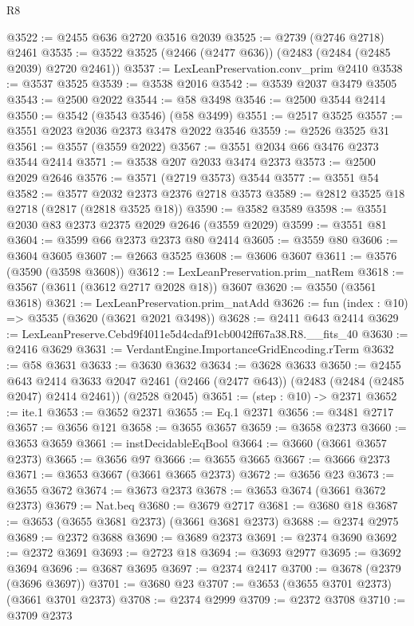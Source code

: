 \begin{lexlean}{R8}
\begin{coremodule}
@3522 := @2455 @636 @2720 @3516 @2039
@3525 := @2739 (@2746 @2718) @2461
@3535 := @3522 @3525 (@2466 (@2477 @636)) (@2483 (@2484 (@2485 @2039) @2720 @2461))
@3537 := LexLeanPreservation.conv_prim @2410
@3538 := @3537 @3525
@3539 := @3538 @2016
@3542 := @3539 @2037 @3479 @3505
@3543 := @2500 @2022
@3544 := @58 @3498
@3546 := @2500 @3544 @2414
@3550 := @3542 (@3543 @3546) (@58 @3499)
@3551 := @2517 @3525
@3557 := @3551 @2023 @2036 @2373 @3478 @2022 @3546
@3559 := @2526 @3525 @31
@3561 := @3557 (@3559 @2022)
@3567 := @3551 @2034 @66 @3476 @2373 @3544 @2414
@3571 := @3538 @207 @2033 @3474 @2373
@3573 := @2500 @2029 @2646
@3576 := @3571 (@2719 @3573) @3544
@3577 := @3551 @54
@3582 := @3577 @2032 @2373 @2376 @2718 @3573
@3589 := @2812 @3525 @18 @2718 (@2817 (@2818 @3525 @18))
@3590 := @3582 @3589
@3598 := @3551 @2030 @83 @2373 @2375 @2029 @2646 (@3559 @2029)
@3599 := @3551 @81
@3604 := @3599 @66 @2373 @2373 @80 @2414
@3605 := @3559 @80
@3606 := @3604 @3605
@3607 := @2663 @3525
@3608 := @3606 @3607
@3611 := @3576 (@3590 (@3598 @3608))
@3612 := LexLeanPreservation.prim_natRem
@3618 := @3567 (@3611 (@3612 @2717 @2028 @18)) @3607
@3620 := @3550 (@3561 @3618)
@3621 := LexLeanPreservation.prim_natAdd
@3626 := fun (index : @10) => @3535 (@3620 (@3621 @2021 @3498))
@3628 := @2411 @643 @2414
@3629 := LexLeanPreserve.Cebd9f4011e5d4cdaf91cb0042ff67a38.R8.__fits_40
@3630 := @2416 @3629
@3631 := VerdantEngine.ImportanceGridEncoding.rTerm
@3632 := @58 @3631
@3633 := @3630 @3632
@3634 := @3628 @3633
@3650 := @2455
    @643
    @2414
    @3633
    @2047
    @2461
    (@2466 (@2477 @643))
    (@2483 (@2484 (@2485 @2047) @2414 @2461))
    (@2528 @2045)
@3651 := (step : @10) -> @2371
@3652 := ite.{1}
@3653 := @3652 @2371
@3655 := Eq.{1} @2371
@3656 := @3481 @2717
@3657 := @3656 @121
@3658 := @3655 @3657
@3659 := @3658 @2373
@3660 := @3653 @3659
@3661 := instDecidableEqBool
@3664 := @3660 (@3661 @3657 @2373)
@3665 := @3656 @97
@3666 := @3655 @3665
@3667 := @3666 @2373
@3671 := @3653 @3667 (@3661 @3665 @2373)
@3672 := @3656 @23
@3673 := @3655 @3672
@3674 := @3673 @2373
@3678 := @3653 @3674 (@3661 @3672 @2373)
@3679 := Nat.beq
@3680 := @3679 @2717
@3681 := @3680 @18
@3687 := @3653 (@3655 @3681 @2373) (@3661 @3681 @2373)
@3688 := @2374 @2975
@3689 := @2372 @3688
@3690 := @3689 @2373
@3691 := @2374 @3690
@3692 := @2372 @3691
@3693 := @2723 @18
@3694 := @3693 @2977
@3695 := @3692 @3694
@3696 := @3687 @3695
@3697 := @2374 @2417
@3700 := @3678 (@2379 (@3696 @3697))
@3701 := @3680 @23
@3707 := @3653 (@3655 @3701 @2373) (@3661 @3701 @2373)
@3708 := @2374 @2999
@3709 := @2372 @3708
@3710 := @3709 @2373

\end{coremodule}
\end{lexlean}
